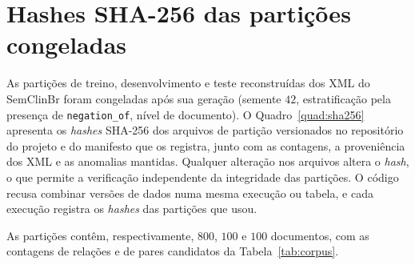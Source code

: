 \chapter[Hashes SHA-256 das partições congeladas]{Hashes SHA-256 das partições congeladas}
\label{ap:sha256}

As partições de treino, desenvolvimento e teste reconstruídas dos XML do SemClinBr
foram congeladas após sua geração (semente $42$, estratificação pela presença de
\texttt{negation\_of}, nível de documento). O Quadro~\ref{quad:sha256} apresenta os
\emph{hashes} SHA-256 dos arquivos de partição versionados no repositório do projeto
e do manifesto que os registra, junto com as contagens, a proveniência dos XML e as
anomalias mantidas. Qualquer alteração nos arquivos altera o \emph{hash}, o que
permite a verificação independente da integridade das partições. O código recusa
combinar versões de dados numa mesma execução ou tabela, e cada execução registra os
\emph{hashes} das partições que usou.



As partições contêm, respectivamente, $800$, $100$ e $100$ documentos, com as
contagens de relações e de pares candidatos da Tabela~\ref{tab:corpus}.
